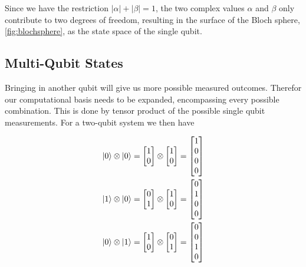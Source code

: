 Since we have the restriction $\lvert\alpha\rvert + \lvert\beta\rvert = 1$, the two complex values $\alpha$ and $\beta$ only contribute to two degrees of freedom, resulting in the surface of the Bloch sphere, \ref{fig:blochsphere}, as the state space of the single qubit. 
\subsection{Multi-Qubit States}

Bringing in another qubit will give us more possible measured outcomes. Therefor our computational basis needs to be expanded, encompassing every possible combination. This is done by tensor product of the possible single qubit measurements. For a two-qubit system we then have

\begin{gather}
\begin{aligned}\label{eq:twoqubit}
    \ket{0} \otimes \ket{0} = \begin{bmatrix} 1 \\ 0 \end{bmatrix} \otimes \begin{bmatrix} 1 \\ 0 \end{bmatrix} &=  \begin{bmatrix} 1 \\ 0 \\ 0 \\ 0\end{bmatrix} \\
    \ket{1} \otimes \ket{0} = \begin{bmatrix} 0 \\ 1 \end{bmatrix} \otimes \begin{bmatrix} 1 \\ 0 \end{bmatrix} &=  \begin{bmatrix} 0 \\ 1 \\ 0 \\ 0\end{bmatrix} \\
    \ket{0} \otimes \ket{1} = \begin{bmatrix} 1 \\ 0 \end{bmatrix} \otimes \begin{bmatrix} 0 \\ 1 \end{bmatrix} &=  \begin{bmatrix} 0 \\ 0 \\ 1 \\ 0\end{bmatrix} \\

\end{aligned}
\end{gather}
